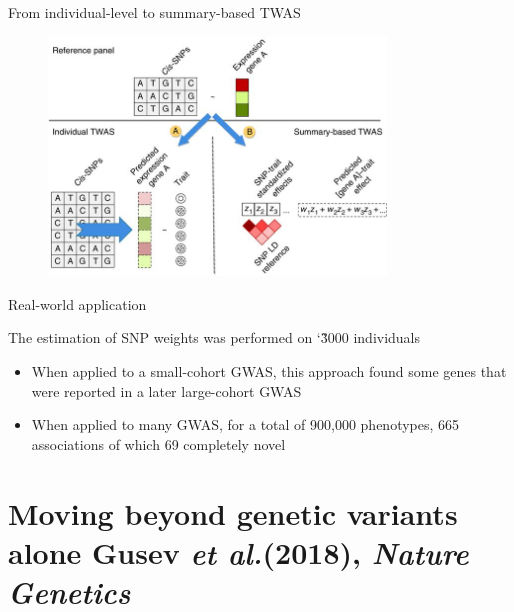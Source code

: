 \documentclass[aspectratio=169,12pt]{beamer}
\newcommand{\etal}{\textit{et al.}\xspace}
\begin{document}
\begin{frame}{From individual-level to summary-based TWAS}

	\begin{figure}
		\includegraphics[width=0.8\textwidth]{gusev2016/1-TWAS_schematic}
	\end{figure}


\end{frame}

\begin{frame}{Real-world application}

	The estimation of SNP weights was performed on \char`\~3000 
individuals

	\begin{itemize}
		\item When applied to a small-cohort GWAS, this approach found 
some genes that were reported in a later large-cohort GWAS
		\item When applied to many GWAS, for a total of 900,000 
phenotypes, 665 associations of which 69 completely novel
	\end{itemize}


\end{frame}

\section{Moving beyond genetic variants alone \newline
\scriptsize Gusev \etal (2018), \textit{Nature Genetics}}
\end{document}
